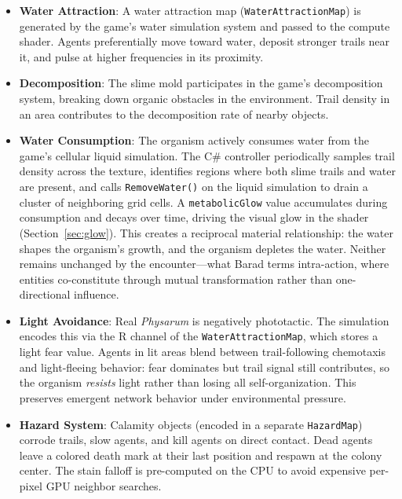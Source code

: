 \documentclass[12pt, titlepage]{article}
\begin{document}
\begin{itemize}
    \item \textbf{Water Attraction}: A water attraction map
    (\texttt{WaterAttractionMap}) is generated by the game's water simulation
    system and passed to the compute shader. Agents preferentially move toward
    water, deposit stronger trails near it, and pulse at higher frequencies in
    its proximity.

    \item \textbf{Decomposition}: The slime mold participates in the game's
    decomposition system, breaking down organic obstacles in the environment.
    Trail density in an area contributes to the decomposition rate of nearby
    objects.

    \item \textbf{Water Consumption}: \label{sec:consumption} The organism
    actively consumes water from the game's cellular liquid simulation. The C\#
    controller periodically samples trail density across the texture, identifies
    regions where both slime trails and water are present, and calls
    \texttt{RemoveWater()} on the liquid simulation to drain a cluster of
    neighboring grid cells. A \texttt{metabolicGlow} value accumulates during
    consumption and decays over time, driving the visual glow in the shader
    (Section~\ref{sec:glow}). This creates a reciprocal material
    relationship: the water shapes the organism's growth, and the organism
    depletes the water. Neither remains unchanged by the encounter---what Barad
    \cite{barad2011} terms intra-action, where entities co-constitute through
    mutual transformation rather than one-directional influence.

    \item \textbf{Light Avoidance}: Real \textit{Physarum} is negatively
    phototactic. The simulation encodes this via the R channel of the
    \texttt{WaterAttractionMap}, which stores a light fear value. Agents in lit
    areas blend between trail-following chemotaxis and light-fleeing behavior:
    fear dominates but trail signal still contributes, so the organism
    \textit{resists} light rather than losing all self-organization. This
    preserves emergent network behavior under environmental pressure.

    \item \textbf{Hazard System}: Calamity objects (encoded in a separate
    \texttt{HazardMap}) corrode trails, slow agents, and kill agents on direct
    contact. Dead agents leave a colored death mark at their last position and
    respawn at the colony center. The stain falloff is pre-computed on the CPU
    to avoid expensive per-pixel GPU neighbor searches.
\end{itemize}
\end{document}
